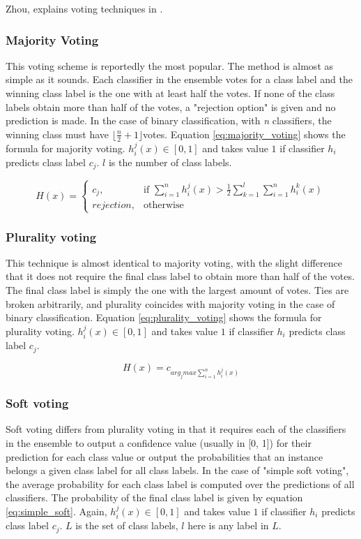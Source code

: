 Zhou, explains voting techniques in \citep[72-75]{zhou2012ensemble}.

\subsubsection{Majority Voting}
This voting scheme is reportedly the most popular. The method is almost as simple as it sounds. Each classifier in the ensemble votes for a class label and the winning class label is the one with at least half the votes. If none of the class labels obtain more than half of the votes, a "rejection option" is given and no prediction is made. In the case of binary classification, with \textit{n} classifiers, the winning class must have $\lfloor \frac{n}{2} + 1\rfloor$votes. Equation \ref{eq:majority_voting} shows the formula for majority voting. $h_i^j(x) \in [0,1]$ and takes value $1$ if classifier $h_i$ predicts class label $c_j$. $l$ is the number of class labels.

\begin{equation}
    H(x) = 
\begin{cases}
    c_j,& \text{if } \sum^n_{i=1}h^j_i(x) > \frac{1}{2}\sum_{k=1}^{l}\sum_{i=1}^n h_i^k(x)\\
    rejection,              & \text{otherwise}
\end{cases}
\label{eq:majority_voting}
\end{equation} 

\subsubsection{Plurality voting}
This technique is almost identical to majority voting, with the slight difference that it does not require the final class label to obtain more than half of the votes. The final class label is simply the one with the largest amount of votes. Ties are broken arbitrarily, and plurality coincides with majority voting in the case of binary classification. Equation \ref{eq:plurality_voting} shows the formula for plurality voting. $h_i^j(x) \in [0,1]$ and takes value $1$ if classifier $h_i$ predicts class label $c_j$.

\begin{equation}
H(x) = c_{arg_j max\sum^n_{i=1}h^j_i(x)}
\label{eq:plurality_voting}
\end{equation}

\subsubsection{Soft voting}
Soft voting differs from plurality voting in that it requires each of the classifiers in the ensemble to output a confidence value (usually in [0, 1]) for their prediction for each class value or output the probabilities that an instance belongs a given class label for all class labels.
In the case of "simple soft voting", the average probability for each class label is computed over the predictions of all classifiers. The probability of the final class label is given by equation \ref{eq:simple_soft}. Again, $h_i^j(x) \in [0,1]$ and takes value $1$ if classifier $h_i$ predicts class label $c_j$. $L$ is the set of class labels, $l$ here is any label in $L$.

